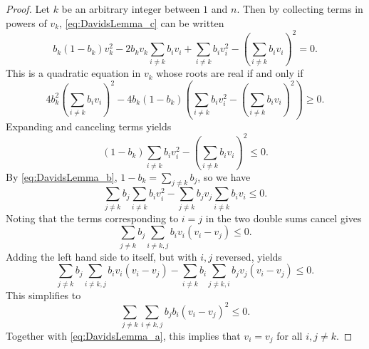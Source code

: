 \begin{proof}
    Let $k$ be an arbitrary integer between $1$ and $n$. 
    Then by collecting terms in powers of $v_k$, \eqref{eq:DavidsLemma_c} 
    can be written
    \begin{equation*}
    		b_k(1-b_k)v_k^2 - 2b_k v_k\sum_{i \neq k}b_i v_i + \sum_{i \neq k}b_i v_i^2 - \left(\sum_{i \neq k}b_i v_i\right)^2 = 0.  		
	\end{equation*}
	This is a quadratic equation in $v_k$ whose roots are real if and only if
	\begin{equation*}
    		4b_k^2\left(\sum_{i \neq k}b_i v_i\right)^2 - 4b_k(1-b_k)\left(\sum_{i \neq k}b_i v_i^2 - \left(\sum_{i \neq k}b_i v_i\right)^2\right) \geq 0.
	\end{equation*}
	Expanding and canceling terms yields
	\begin{equation*}
    (1-b_k)\sum_{i \neq k}b_i v_i^2 - \left(\sum_{i \neq k}b_i v_i\right)^2 \leq 0.
	\end{equation*}
	By \eqref{eq:DavidsLemma_b}, $1-b_k = \sum_{j \ne k}b_j$, so we have
	\begin{equation*}
    		\sum_{j \neq k}b_j\sum_{i \neq k}b_i v_i^2 - \sum_{j \neq k}b_j v_j\sum_{i \neq k}b_i v_i \leq 0.
	\end{equation*}
	Noting that the terms corresponding to $i = j$ in the two double sums cancel gives
	\begin{equation*}
    		\sum_{j \neq k}b_j\sum_{i \neq k,j}b_i v_i(v_i - v_j) \leq 0.
	\end{equation*}
	Adding the left hand side to itself, but with $i, j$ reversed, yields
	\begin{equation*}
    		\sum_{j \neq k}b_j\sum_{i \neq k, j}b_i v_i(v_i - v_j) - \sum_{i \neq k}b_i\sum_{j \neq k, i}b_j v_j(v_i - v_j) \leq 0.
	\end{equation*}
	This simplifies to
	\begin{equation*}
    		\sum_{j \neq k}\sum_{i \neq k, j}b_j b_i(v_i - v_j)^2 \leq 0.
	\end{equation*}
	Together with \eqref{eq:DavidsLemma_a}, this implies that $v_i = v_j$ 
	for all $i, j \neq k$.
\end{proof}

